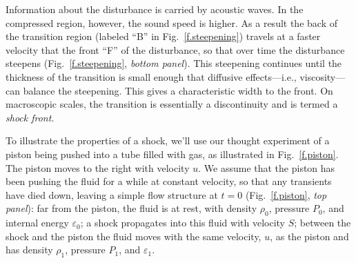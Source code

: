 Information about the disturbance is carried by acoustic waves.  In the compressed region, however, the sound speed is higher.  As a result the back of the transition region (labeled ``B'' in Fig.~\ref{f.steepening}) travels at a faster velocity that the front ``F'' of the disturbance, so that over time the disturbance steepens (Fig.~\ref{f.steepening}, \emph{bottom panel}). This steepening continues until the thickness of the transition is small enough that diffusive effects---i.e., viscosity---can balance the steepening.  This gives a characteristic width to the front.  On macroscopic scales, the transition is essentially a discontinuity and is termed a \emph{shock front}.

To illustrate the properties of a shock, we'll use our thought experiment of a piston being pushed into a tube filled with gas, as illustrated in Fig.~\ref{f.piston}.  The piston moves to the right with velocity $u$.  We assume that the piston has been pushing the fluid for a while at constant velocity, so that any transients have died down, leaving a simple flow structure at $t=0$ (Fig.~\ref{f.piston}, \emph{top panel}): far from the piston, the fluid is at rest, with density $\rho_{0}$, pressure $P_{0}$, and internal energy $\varepsilon_{0}$; a shock propagates into this fluid with velocity $S$; between the shock and the piston the fluid moves with the same velocity, $u$, as the piston and has density $\rho_{1}$, pressure $P_{1}$, and $\varepsilon_{1}$.

